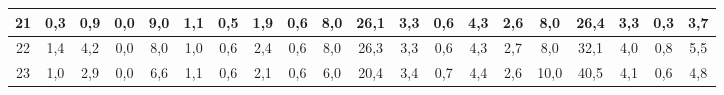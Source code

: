 \begin{sidewaystable}[]
\begin{tabular}{|c|c|c|c|c|c|c|c|c|c|c|c|c|c|c|c|c|c|c|c|}
    21 & 0,3                                             & 0,9                                             & 0,0                                             & 9,0                                              & 1,1                                              & 0,5                                              & 1,9                                              & 0,6                                              & 8,0                                              & 26,1                                             & 3,3                                              & 0,6                                              & 4,3                                              & 2,6                                              & 8,0                                              & 26,4                                             & 3,3                                              & 0,3                                              & 3,7                                              \\ \hline
    22 & 1,4                                             & 4,2                                             & 0,0                                             & 8,0                                              & 1,0                                              & 0,6                                              & 2,4                                              & 0,6                                              & 8,0                                              & 26,3                                             & 3,3                                              & 0,6                                              & 4,3                                              & 2,7                                              & 8,0                                              & 32,1                                             & 4,0                                              & 0,8                                              & 5,5                                              \\ \hline
    23 & 1,0                                             & 2,9                                             & 0,0                                             & 6,6                                              & 1,1                                              & 0,6                                              & 2,1                                              & 0,6                                              & 6,0                                              & 20,4                                             & 3,4                                              & 0,7                                              & 4,4                                              & 2,6                                              & 10,0                                             & 40,5                                             & 4,1                                              & 0,6                                              & 4,8                                              \\ \hline

\end{tabular}
\end{sidewaystable}
